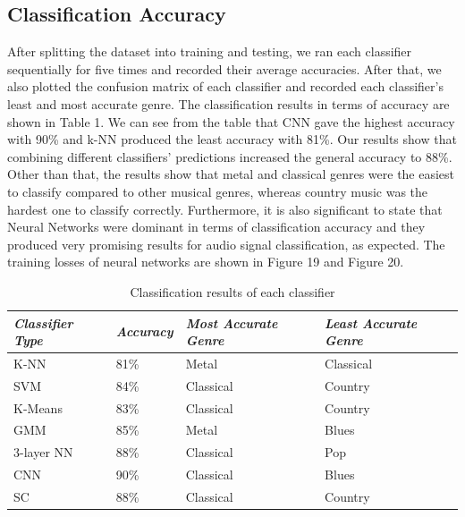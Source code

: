\subsection{Classification Accuracy}
After splitting the dataset into training and testing, we ran each classifier sequentially for five times and recorded their average accuracies. After that, we also plotted the confusion matrix of each classifier and recorded each classifier's least and most accurate genre. The classification results in terms of accuracy are shown in Table 1. We can see from the table that CNN gave the highest accuracy with 90\% and k-NN produced the least accuracy with 81\%. Our results show that combining different classifiers' predictions increased the general accuracy to 88\%. Other than that, the results show that metal and classical genres were the easiest to classify compared to other musical genres, whereas country music was the hardest one to classify correctly. Furthermore, it is also significant to state that Neural Networks were dominant in terms of classification accuracy and they produced very promising results for audio signal classification, as expected. The training losses of neural networks are shown in Figure 19 and Figure 20. 
\begin{table}
\begin{center}
\caption{Classification results of each classifier} 
\begin{tabular}{ p{1.9cm} p{1.1cm} p{2.8cm} p{2.8cm}}
 \emph{Classifier Type} & \emph{Accuracy}  & \emph{Most Accurate Genre} & \emph{Least Accurate Genre}\\
 \hline
 K-NN & 81\% & Metal & Classical \\
 SVM & 84\% & Classical & Country \\
 K-Means & 83\% & Classical & Country \\
 GMM & 85\% & Metal & Blues \\
 3-layer NN & 88\% & Classical & Pop \\
 CNN & 90\% & Classical & Blues \\
 SC & 88\% & Classical  & Country  \\
\end{tabular}
\end{center}
\end{table}

